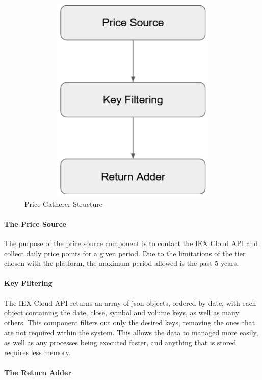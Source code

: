 \begin{figure}[h]
    \centering
    \includegraphics[width=15cm,height=10cm,keepaspectratio]{design/PriceGathererStructure.png}
    \caption{Price Gatherer Structure}
    \label{fig:pricegathererstructure}
\end{figure}

\paragraph{The Price Source}

The purpose of the price source component is to contact the IEX Cloud API and collect daily price points for a given period. Due to the limitations of the tier chosen with the platform, the maximum period allowed is the past 5 years.

\paragraph{Key Filtering}

The IEX Cloud API returns an array of json objects, ordered by date, with each object containing the date, close, symbol and volume keys, as well as many others. This component filters out only the desired keys, removing the ones that are not required within the system. This allows the data to managed more easily, as well as any processes being executed faster, and anything that is stored requires less memory.

\paragraph{The Return Adder}

